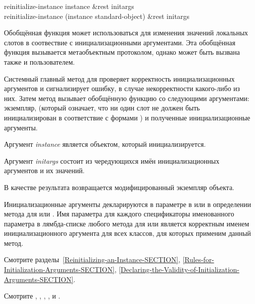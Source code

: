 \begin{defun}
reinitialize-instance instance &rest initargs \\
reinitialize-instance (instance standard-object) &rest initargs

Обобщённая функция  может использоваться для
изменения значений локальных слотов в соотвествие с инициализационными
аргументами. Эта обобщённая функция вызывается метаобъектным протоколом, однако
может быть вызвана также и пользователем.

Системный главный метод для  проверяет корректность
инициализационных аргументов и сигнализирует ошибку, в случае некорректности
какого-либо из них. Затем метод вызывает обобщённую функцию
 со следующими аргументами: экземпляр,  (который
означает, что ни один слот не должен быть инициализирован в соответствие с формами
) и полученные инициализационные аргументы.

Аргумент \emph{instance} является объектом, который инициализируется.

Аргумент \emph{initargs} состоит из чередующихся имён инициализационных
аргументов и их значений.

В качестве результата возвращается модифицированный экземпляр объекта.

Инициализационные аргументы декларируются в параметре  в
 или в определении метода для  или
. Имя параметра для каждого спецификаторы именованного
параметра в лямбда-списке любого метода для  или
 является корректным именем инициализационного аргумента
для всех классов, для которых применим данный метод.

Смотрите разделы~\ref{Reinitializing-an-Instance-SECTION},
\ref{Rules-for-Initialization-Arguments-SECTION},
\ref{Declaring-the-Validity-of-Initialization-Arguments-SECTION}.

Смотрите , ,
,
,
 и .
\end{defun}


